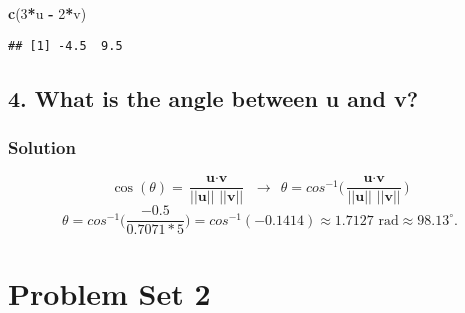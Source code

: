 \documentclass[]{article}
\newenvironment{Shaded}{\begin{snugshade}}{\end{snugshade}}
\newcommand{\KeywordTok}[1]{\textcolor[rgb]{0.13,0.29,0.53}{\textbf{#1}}}
\newcommand{\DecValTok}[1]{\textcolor[rgb]{0.00,0.00,0.81}{#1}}
\newcommand{\StringTok}[1]{\textcolor[rgb]{0.31,0.60,0.02}{#1}}
\newcommand{\OperatorTok}[1]{\textcolor[rgb]{0.81,0.36,0.00}{\textbf{#1}}}
\newcommand{\NormalTok}[1]{#1}
\begin{document}
\begin{Shaded}
\begin{Highlighting}[]
\KeywordTok{c}\NormalTok{(}\DecValTok{3}\OperatorTok{*}\NormalTok{u }\OperatorTok{-}\StringTok{ }\DecValTok{2}\OperatorTok{*}\NormalTok{v)}
\end{Highlighting}
\end{Shaded}

\begin{verbatim}
## [1] -4.5  9.5
\end{verbatim}

\subsection{4. What is the angle between u and
v?}\label{what-is-the-angle-between-u-and-v}

\subsubsection{Solution}\label{solution-3}

\[\cos(\theta) = \frac{\textbf{u}\cdot\textbf{v}}{\textbf{||u|| ||v||}} \ \ \to \ \ \theta = cos^{-1}\Bigg(\frac{\textbf{u}\cdot\textbf{v}}{\textbf{||u|| ||v||}}\Bigg) \]
\[\theta = cos^{-1}\Bigg(\frac{-0.5}{0.7071*5}\Bigg) = cos^{-1}(-0.1414) \approx 1.7127 \text{ rad} \approx 98.13^{\circ}.\]

\section{Problem Set 2}\label{problem-set-2}
\end{document}

